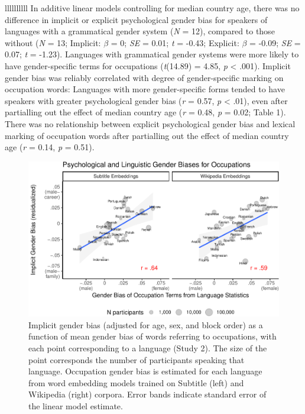 \documentclass[9pt,twocolumn,twoside,lineno]{pnas-new}
\begin{document}
\begin{table}{llllllllll}
In additive linear models controlling for median country age, there was
no difference in implicit or explicit psychological gender bias for
speakers of languages with a grammatical gender system (\emph{N} = 12),
compared to those without (\emph{N} = 13; Implicit: \(\beta\) = 0;
\emph{SE} = 0.01; \emph{t} = -0.43; Explicit: \(\beta\) = -0.09;
\emph{SE} = 0.07; \emph{t} = -1.23). Languages with grammatical gender
systems were more likely to have gender-specific terms for occupations
(\emph{t}(14.89) = 4.85, \emph{p} \textless{} .001). Implicit gender
bias was reliably correlated with degree of gender-specific marking on
occupation words: Languages with more gender-specific forms tended to
have speakers with greater psychological gender bias (\emph{r} = 0.57,
\emph{p} \textless{} .01), even after partialling out the effect of
median country age (\emph{r} = 0.48, \emph{p} = 0.02; Table 1). There
was no relationship between explicit psychological gender bias and
lexical marking of occupation words after partialling out the effect of
median country age (\emph{r} = 0.14, \emph{p} = 0.51).

\begin{figure}[t!]
\centering
\includegraphics{iat_lang_files/figure-latex/unnamed-chunk-15-1.pdf}
\caption{\label{fig:unnamed-chunk-15}Implicit gender bias (adjusted for age,
sex, and block order) as a function of mean gender bias of words
referring to occupations, with each point corresponding to a language
(Study 2). The size of the point corresponds the number of participants
speaking that language. Occupation gender bias is estimated for each
language from word embedding models trained on Subtitle (left) and
Wikipedia (right) corpora. Error bands indicate standard error of the
linear model estimate.}
\end{figure}


\end{table}
\end{document}
